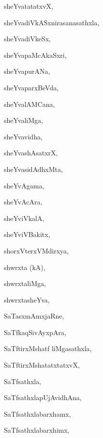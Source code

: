 \begin{multicols}{3}
{\noindent
{sheYvatatatxvX}, \pageref{sheYvatatatxvX}

\noindent
{sheYvadiVkASxnirasanasathxla}, \pageref{sheYvadiVkASxnirasanasathxla}

\noindent
{sheYvadiVkeSx}, \pageref{sheYvadiVkeSx}

\noindent
{sheYvapaMcAkaSxri}, \pageref{sheYvapaMcAkaSxri}

\noindent
{sheYvapurANa}, \pageref{sheYvapurANa}

\noindent
{sheYvaparxBeVda}, \pageref{sheYvaparxBeVda}

\noindent
{sheYvalAMCana}, \pageref{sheYvalAMCana}

\noindent
{sheYvaliMga}, \pageref{sheYvaliMga}

\noindent
{sheYvavidha}, \pageref{sheYvavidha}

\noindent
{sheYvashAsatxrX}, \pageref{sheYvashAsatxrX}

\noindent
{sheYvasidAdhxMta}, \pageref{sheYvasidAdhxMta}

\noindent
{sheYvAgama}, \pageref{sheYvAgama}

\noindent
{sheYvAcAra}, \pageref{sheYvAcAra}

\noindent
{sheYviVkalA}, \pageref{sheYviVkalA}

\noindent
{sheYviVBakitx}, \pageref{sheYviVBakitx}

\noindent
{shorxVterxVMdirxya}, \pageref{shorxVterxVMdirxya}

\noindent
{shwrxta (kA)}, \pageref{shwrxtakA}

\noindent
{shwrxtaliMga}, \pageref{shwrxtaliMga}

\noindent
{shwrxtasheYva}, \pageref{shwrxtasheYva}

\bigskip
\noindent
{}
\smallskip

\noindent
{SaTasxmAmxjaRne}, \pageref{SaTasxmAmxjaRne}

\noindent
{SaTfkaqSivAyxpAra}, \pageref{SaTfkaqSivAyxpAra}

\noindent
{SaTftirxMshatf liMgasathxla}, \pageref{SaTftirxMshatfliMgasathxla}

\noindent
{SaTftirxMshatatxtatxvX}, \pageref{SaTftirxMshatatxtatxvX}

\noindent
{SaTfsathxla}, \pageref{SaTfsathxla}

\noindent
{SaTfsathxlapUjAvidhAna}, \pageref{SaTfsathxlapUjAvidhAna}

\noindent
{SaTfsathxlabarxhamx}, \pageref{SaTfsathxlabarxhamx}

\noindent
{SaTfsathxlabarxhimx}, \pageref{SaTfsathxlabarxhimx}

}
\end{multicols}
